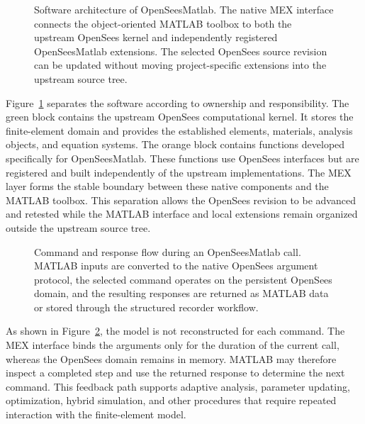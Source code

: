 
\begin{figure}[htbp]
    \centering
    
    \caption{Software architecture of OpenSeesMatlab. The native MEX interface
    connects the object-oriented MATLAB toolbox to both the upstream OpenSees
    kernel and independently registered OpenSeesMatlab extensions. The selected
    OpenSees source revision can be updated without moving project-specific
    extensions into the upstream source tree.}
    \label{fig:opensees_matlab_architecture}
\end{figure}

Figure~\ref{fig:opensees_matlab_architecture} separates the software according
to ownership and responsibility. The green block contains the upstream
OpenSees computational kernel. It stores the finite-element domain and
provides the established elements, materials, analysis objects, and equation
systems. The orange block contains functions developed specifically for
OpenSeesMatlab. These functions use OpenSees interfaces but are registered and
built independently of the upstream implementations. The MEX layer forms the
stable boundary between these native components and the MATLAB toolbox. This
separation allows the OpenSees revision to be advanced and retested while the
MATLAB interface and local extensions remain organized outside the upstream
source tree.

\begin{figure}[htbp]
    \centering
    
    \caption{Command and response flow during an OpenSeesMatlab call. MATLAB
    inputs are converted to the native OpenSees argument protocol, the selected
    command operates on the persistent OpenSees domain, and the resulting
    responses are returned as MATLAB data or stored through the structured
    recorder workflow.}
    \label{fig:opensees_matlab_command_flow}
\end{figure}

As shown in Figure~\ref{fig:opensees_matlab_command_flow}, the model is not
reconstructed for each command. The MEX interface binds the arguments only for
the duration of the current call, whereas the OpenSees domain remains in
memory. MATLAB may therefore inspect a completed step and use the returned
response to determine the next command. This feedback path supports adaptive
analysis, parameter updating, optimization, hybrid simulation, and other
procedures that require repeated interaction with the finite-element model.
